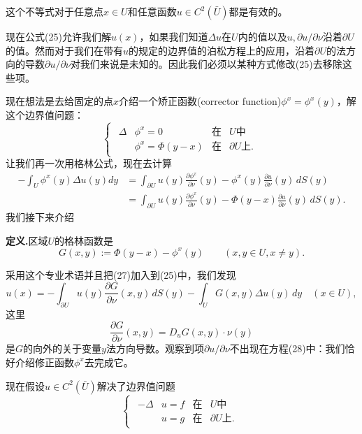 \documentclass[leqno]{article}
\numberwithin{equation}{subsection}%
\begin{document}
这个不等式对于任意点$x\in U$和任意函数$u\in C^{2}(\bar{U})$都是有效的。
\par
现在公式(25)允许我们解$u(x)$，如果我们知道$\Delta u$在$U$内的值以及$u,\partial u/\partial \nu$沿着$\partial U$的值。然而对于我们在带有$u$的规定的边界值的泊松方程上的应用，沿着$\partial U$的法方向的导数$\partial u/\partial \nu$对我们来说是未知的。因此我们必须以某种方式修改(25)去移除这些项。
\par
现在想法是去给固定的点$x$介绍一个矫正函数(corrector function)$\phi^{x}=\phi^{x}(y)$，解这个边界值问题：
\begin{equation}
\begin{cases}
\begin{aligned}
\Delta&{}\phi^{x}=0 &\text{在} &U \text{中}\\
&\phi^{x}=\Phi(y-x) &\text{在} &\partial U\text{上}.
\end{aligned}
\end{cases}
\end{equation}
让我们再一次用格林公式，现在去计算
\begin{equation}
\begin{aligned}
-\int_{U}\phi^{x}(y)\Delta u(y)dy&=\int_{\partial U}u(y)\frac{\partial\phi^{x}}{\partial\nu}(y)-\phi^{x}(y)\frac{\partial u}{\partial\nu}(y)\,dS(y)\\
&=\int_{\partial U}u(y)\frac{\partial\phi^{x}}{\partial\nu}(y)-\Phi(y-x)\frac{\partial u}{\partial\nu}(y)\,dS(y).
\end{aligned}
\end{equation}
我们接下来介绍
\par
\noindent\textbf{定义.}区域$U$的格林函数是
\begin{equation*}
G(x,y):=\Phi(y-x)-\phi^{x}(y)\qquad(x,y\in U,x\neq y).
\end{equation*}
\par
采用这个专业术语并且把(27)加入到(25)中，我们发现
\begin{equation}
u(x)=-\int_{\partial U}u(y)\frac{\partial G}{\partial\nu}(x,y)\,dS(y)-\int_{U}G(x,y)\Delta u(y)\,dy\quad(x\in U),
\end{equation}
这里
\begin{equation*}
\frac{\partial G}{\partial\nu}(x,y)=D_{u}G(x,y)\cdot\nu(y)
\end{equation*}
是$G$的向外的关于变量$y$法方向导数。观察到项$\partial u/\partial \nu$不出现在方程(28)中：我们恰好介绍修正函数$\phi^{x}$去完成它。
\par
现在假设$u\in C^{2}(\bar{U})$解决了边界值问题
\begin{equation}
\begin{cases}
\begin{aligned}
-\Delta&u=f &\text{在} &U \text{中}\\
&u=g&\text{在} &\partial U\text{上}.
\end{aligned}
\end{cases}
\end{equation}
\end{document}
